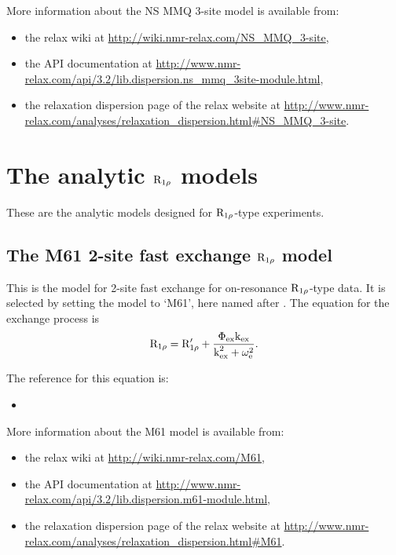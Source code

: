 More information about the NS MMQ 3-site model is available from:
\begin{itemize}
  \item the relax wiki at \url{http://wiki.nmr-relax.com/NS\_MMQ\_3-site},
  \item the API documentation at \url{http://www.nmr-relax.com/api/3.2/lib.dispersion.ns\_mmq\_3site-module.html},
  \item the relaxation dispersion page of the relax website at \url{http://www.nmr-relax.com/analyses/relaxation\_dispersion.html#NS\_MMQ\_3-site}.
\end{itemize}




\section{The analytic $\mathrm{R}_{1\rho}$ models}
\label{sect: dispersion: analytic R1rho models}

These are the analytic models designed for $\mathrm{R}_{1\rho}$-type experiments.



\subsection{The M61 2-site fast exchange $\mathrm{R}_{1\rho}$ model}
\label{sect: dispersion: M61 model}

This is the model for 2-site fast exchange for on-resonance $\mathrm{R}_{1\rho}$-type data.
It is selected by setting the model to `M61', here named after \citet{Meiboom61}.
The equation for the exchange process is
\begin{equation}
    \mathrm{R}_{1\rho} = \mathrm{R}_{1\rho}' + \frac{\Phi_{\textrm{ex}}\textrm{k}_{\textrm{ex}}}{\textrm{k}_{\textrm{ex}}^2 + \omega_{\textrm{e}}^2}.
\end{equation}

The reference for this equation is:
\begin{itemize}
  \item {}
\end{itemize}

More information about the M61 model is available from:
\begin{itemize}
  \item the relax wiki at \url{http://wiki.nmr-relax.com/M61},
  \item the API documentation at \url{http://www.nmr-relax.com/api/3.2/lib.dispersion.m61-module.html},
  \item the relaxation dispersion page of the relax website at \url{http://www.nmr-relax.com/analyses/relaxation\_dispersion.html#M61}.
\end{itemize}



